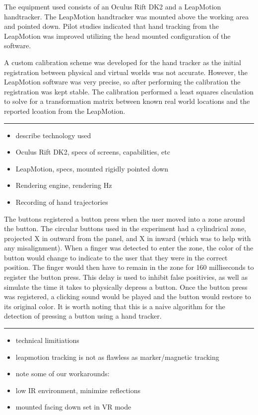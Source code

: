 The equipment used consists of an Oculus Rift DK2 and a LeapMotion handtracker.
The LeapMotion handtracker was mounted above the working area and pointed down.
Pilot studies indicated that hand tracking from the LeapMotion was improved utilizing the head mounted configuration of the software.

A custom calibration scheme was developed for the hand tracker as the initial registration between physical and virtual worlds was not accurate.
However, the LeapMotion software was very precise, so after performing the calibration the registration was kept stable.
The calibration performed a least squares claculation to solve for a transformation matrix between known real world locations and the reported lcoation from the LeapMotion.

\rule{0.75\textwidth}{1pt}
\begin{itemize}
  \item describe technology used
  \item Oculus Rift DK2, specs of screens, capabilities, etc
  \item LeapMotion, specs, mounted rigidly pointed down
  \item Rendering engine, rendering Hz
  \item Recording of hand trajectories
\end{itemize}

The buttons registered a button press when the user moved into a zone around the button.
The circular buttons used in the experiment had a cylindrical zone, projected X in outward from the panel, and X in inward (which was to help with any misalignment).
When a finger was detected to enter the zone, the color of the button would change to indicate to the user that they were in the correct position.
The finger would then have to remain in the zone for 160 milliseconds to register the button press.
This delay is used to inhibit false positivies, as well as simulate the time it takes to physically depress a button.
Once the button press was registered, a clicking sound would be played and the button would restore to its original color.
It is worth noting that this is a naive algorithm for the detection of pressing a button using a hand tracker.

\rule{0.75\textwidth}{1pt}
\begin{itemize}
  \item technical limitiations
  \item leapmotion tracking is not as flawless as marker/magnetic tracking
  \item note some of our workarounds:
  \item low IR environment, minimize reflections
  \item mounted facing down set in VR mode
\end{itemize}

